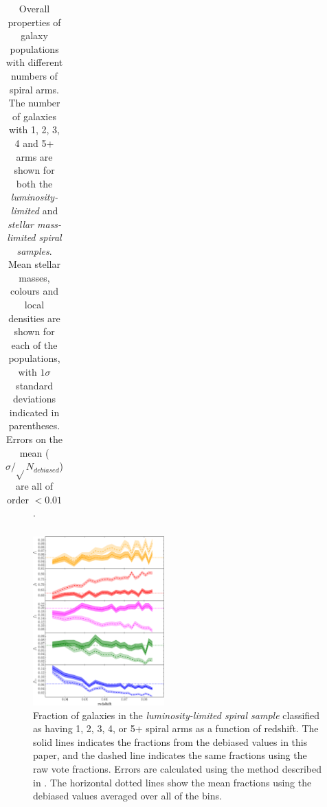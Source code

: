 \documentclass[useAMS,usenatbib]{mn2e}
\begin{document}
\begin{table}
\begin{tabular}{cccccccccc}
\end{tabular}

\caption{Overall properties of galaxy populations with different numbers of spiral arms. The number of galaxies with 1, 2, 3, 4 and 5+ arms are shown for both the \textit{luminosity-limited} and \textit{stellar mass-limited spiral samples}. Mean stellar masses, colours and local densities are shown for each of the populations, with $1 \sigma$ standard deviations indicated in parentheses. Errors on the mean ($\sigma / \sqrt{}N_{debiased}$) are all of order $ < 0.01$.}

\label{table:overall_property_table}

\end{table}

\begin{figure}
		\centering

        \includegraphics[width=0.45\textwidth]{Images/Results/sample_fractions.pdf}

        \caption{Fraction of galaxies in the \textit{luminosity-limited spiral sample} classified as having 1, 2, 3, 4, or 5+ spiral arms as a function of redshift. The solid lines indicates the fractions from the debiased values in this paper, and the dashed line indicates the same fractions using the raw vote fractions. Errors are calculated using the method described in \citet{Cameron_11}. The horizontal dotted lines show the mean fractions using the debiased values averaged over all of the bins.}

        \label{fig:arm_number_trend}

\end{figure}
\end{document}

